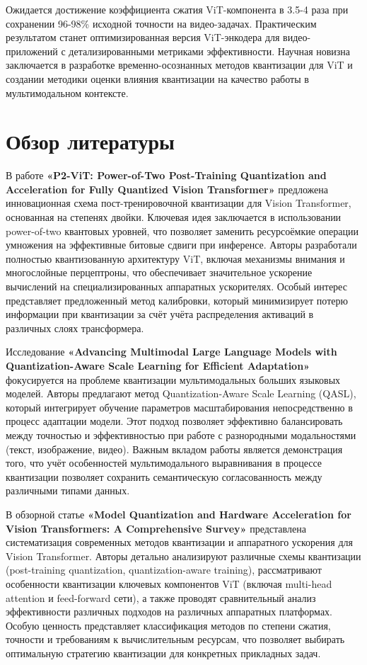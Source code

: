 \documentclass{article}
\begin{document}
Ожидается достижение коэффициента сжатия ViT-компонента в 3.5-4 раза при сохранении 96-98\% исходной точности на видео-задачах. Практическим результатом станет оптимизированная версия ViT-энкодера для видео-приложений с детализированными метриками эффективности. Научная новизна заключается в разработке временно-осознанных методов квантизации для ViT и создании методики оценки влияния квантизации на качество работы в мультимодальном контексте.

\section{Обзор литературы}

В работе \textbf{«P2-ViT: Power-of-Two Post-Training Quantization and Acceleration for Fully Quantized Vision Transformer»} предложена инновационная схема пост-тренировочной квантизации для Vision Transformer, основанная на степенях двойки. Ключевая идея заключается в использовании power-of-two квантовых уровней, что позволяет заменить ресурсоёмкие операции умножения на эффективные битовые сдвиги при инференсе. Авторы разработали полностью квантизованную архитектуру ViT, включая механизмы внимания и многослойные перцептроны, что обеспечивает значительное ускорение вычислений на специализированных аппаратных ускорителях. Особый интерес представляет предложенный метод калибровки, который минимизирует потерю информации при квантизации за счёт учёта распределения активаций в различных слоях трансформера.

Исследование \textbf{«Advancing Multimodal Large Language Models with Quantization-Aware Scale Learning for Efficient Adaptation»} фокусируется на проблеме квантизации мультимодальных больших языковых моделей. Авторы предлагают метод Quantization-Aware Scale Learning (QASL), который интегрирует обучение параметров масштабирования непосредственно в процесс адаптации модели. Этот подход позволяет эффективно балансировать между точностью и эффективностью при работе с разнородными модальностями (текст, изображение, видео). Важным вкладом работы является демонстрация того, что учёт особенностей мультимодального выравнивания в процессе квантизации позволяет сохранить семантическую согласованность между различными типами данных.

В обзорной статье \textbf{«Model Quantization and Hardware Acceleration for Vision Transformers: A Comprehensive Survey»} представлена систематизация современных методов квантизации и аппаратного ускорения для Vision Transformer. Авторы детально анализируют различные схемы квантизации (post-training quantization, quantization-aware training), рассматривают особенности квантизации ключевых компонентов ViT (включая multi-head attention и feed-forward сети), а также проводят сравнительный анализ эффективности различных подходов на различных аппаратных платформах. Особую ценность представляет классификация методов по степени сжатия, точности и требованиям к вычислительным ресурсам, что позволяет выбирать оптимальную стратегию квантизации для конкретных прикладных задач.
\end{document}
